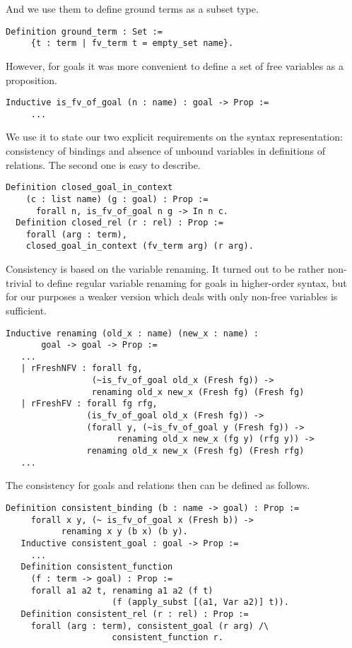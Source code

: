 And we use them to define ground terms as a subset type.

\begin{lstlisting}[language=Coq]
   Definition ground_term : Set :=
     {t : term | fv_term t = empty_set name}.
\end{lstlisting}

However, for goals it was more convenient to define a set of free variables as a proposition.

\begin{lstlisting}[language=Coq]
   Inductive is_fv_of_goal (n : name) : goal -> Prop :=
     ...
\end{lstlisting}

We use it to state our two explicit requirements on the syntax representation: consistency of bindings and absence of unbound variables in definitions of relations. The second one is easy to describe.

\begin{lstlisting}[language=Coq] 
  Definition closed_goal_in_context 
    (c : list name) (g : goal) : Prop :=
      forall n, is_fv_of_goal n g -> In n c.
  Definition closed_rel (r : rel) : Prop :=
    forall (arg : term),
    closed_goal_in_context (fv_term arg) (r arg).
\end{lstlisting}

Consistency is based on the variable renaming. It turned out to be rather non-trivial to define regular variable renaming for goals in higher-order syntax, but for our purposes
a weaker version which deals with only non-free variables is sufficient.

\begin{lstlisting}[language=Coq]
   Inductive renaming (old_x : name) (new_x : name) :
       goal -> goal -> Prop :=
   ...
   | rFreshNFV : forall fg,
                 (~is_fv_of_goal old_x (Fresh fg)) ->
                 renaming old_x new_x (Fresh fg) (Fresh fg)
   | rFreshFV : forall fg rfg,
                (is_fv_of_goal old_x (Fresh fg)) ->
                (forall y, (~is_fv_of_goal y (Fresh fg)) ->
                      renaming old_x new_x (fg y) (rfg y)) ->
                renaming old_x new_x (Fresh fg) (Fresh rfg)
   ...
\end{lstlisting}

The consistency for goals and relations then can be defined as follows.

\begin{lstlisting}[language=Coq]
   Definition consistent_binding (b : name -> goal) : Prop :=
     forall x y, (~ is_fv_of_goal x (Fresh b)) ->
           renaming x y (b x) (b y).
   Inductive consistent_goal : goal -> Prop :=
     ...
   Definition consistent_function
     (f : term -> goal) : Prop :=
     forall a1 a2 t, renaming a1 a2 (f t)
                     (f (apply_subst [(a1, Var a2)] t)).
   Definition consistent_rel (r : rel) : Prop :=
     forall (arg : term), consistent_goal (r arg) /\
                     consistent_function r.
\end{lstlisting}

